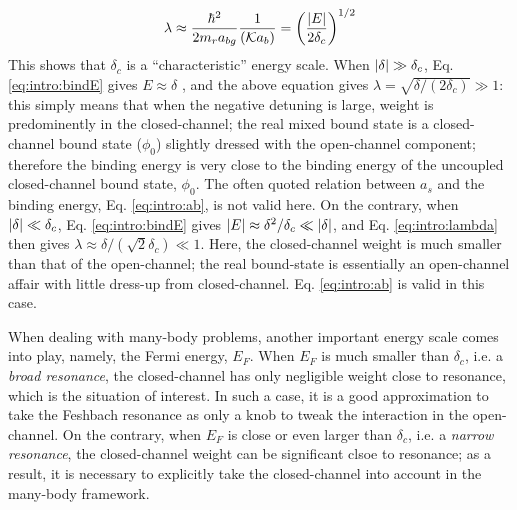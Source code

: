 \begin{equation}\label{eq:intro:lambda}
\lambda\approx\frac{\hbar^{2}}{2m_{r}a_{bg}}\frac{1}{(\mathcal{K}a_{b})}=\left(\frac{\left\lvert{E}\right\rvert}{2\delta_{c}}\right)^{1/2}
\end{equation}
This shows that  $\delta_{c}$ is a ``characteristic'' energy scale. When $\left\lvert{\delta}\right\rvert\gg\delta_{c}$, Eq. \ref{eq:intro:bindE} gives $E\approx\delta$ , and the above equation gives $\lambda=\sqrt{\delta/(2\delta_{c})}\gg1$: this simply means that when the negative detuning is large, weight is predominently in the closed-channel; the real mixed bound state is a closed-channel bound state ($\phi_{0}$) slightly dressed with the open-channel component; therefore the binding energy is very close to the binding energy  of the uncoupled closed-channel bound state, $\phi_{0}$.  The often quoted relation between $a_{s}$ and the binding energy, Eq. \ref{eq:intro:ab},  is not valid here.  On the contrary, when $\left\lvert{\delta}\right\rvert\ll\delta_{c}$, Eq. \ref{eq:intro:bindE}  gives $\left\lvert{E}\right\rvert\approx\delta^{2}/\delta_{c}\ll\left\lvert{\delta}\right\rvert$,  and Eq. \ref{eq:intro:lambda} then gives $\lambda\approx{\delta/(\sqrt{2}\delta_{c})}\ll1$.  Here, the closed-channel weight is much smaller than that of the open-channel; the real bound-state is essentially an open-channel affair with little dress-up from closed-channel.  Eq. \ref{eq:intro:ab} is valid in this case. %

When dealing with  many-body problems, another important energy scale comes into play, namely, the Fermi energy, $E_{F}$.  When $E_{F}$ is much smaller than $\delta_{c}$, i.e. a \emph{broad resonance},  the closed-channel has only negligible weight close to resonance, which is the situation of interest. In such a case, it is a good approximation to take the Feshbach resonance as only a knob to tweak the interaction in the open-channel.  On the contrary, when $E_{F}$ is close or even larger than $\delta_{c}$, i.e. a \emph{narrow resonance}, the closed-channel weight can be  significant clsoe to  resonance; as a result, it is necessary to explicitly take the closed-channel into account in the many-body framework.  










